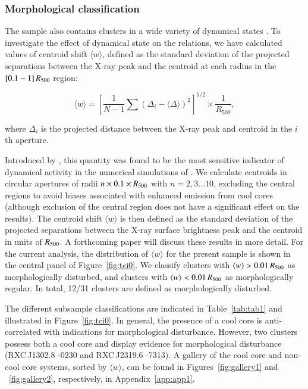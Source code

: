 \documentclass[oldversion]{aa}
\begin{document}
{\subsubsection{Morphological classification}

The sample also contains clusters in a wide variety of dynamical
states \citep{boehringer07,pratt07}. To investigate the effect of
dynamical state on the relations, we have calculated values of centroid shift
$\langle w \rangle$, defined as the standard deviation of the
projected separations between the X-ray peak and the centroid at each
radius in the $[0.1 -1]\, R_{500}$ region:

\begin{equation}
\langle w \rangle = \left[ \frac{1}{N-1} \sum \left(\Delta_i - \langle \Delta \rangle \right)^2 \right]^{1/2} \times \frac{1}{R_{500}}, 
\end{equation}

\noindent where $\Delta_i$ is the projected distance between the X-ray peak and centroid in the $i$\,th aperture.

Introduced by \citet{mfg93}, this quantity was found to be the most sensitive indicator of dynamical activity in the numerical simulations of \citet{poole07}. We calculate centroids in circular apertures of radii $n \times 0.1 \times R_{500}$ with $n=2, 3\ldots10$, excluding the central regions to avoid biases associated with enhanced emission from cool cores (although exclusion of the central region does not have a significant effect on the results). The centroid shift $\langle w \rangle$ is then defined as the standard deviation of the projected separations between the X-ray surface brightness peak and the centroid in units of $R_{500}$. A forthcoming paper will discuss these results in more detail. For the current analysis, the distribution of $\langle w \rangle$ for the present sample is shown in the central panel of Figure~\ref{fig:tci0}. We classify clusters with $\langle w \rangle > 0.01\,R_{500}$ as morphologically disturbed, and
clusters with $\langle w \rangle < 0.01\,R_{500}$ as morphologically
regular. In total, 12/31 clusters are defined as morphologically disturbed. 

The different subsample classifications are indicated in Table~\ref{tab:tab1} and illustrated in Figure~\ref{fig:tci0}. In general, the presence of a cool core is anti-correlated with indications for morphological disturbance. However, two clusters possess both a cool core and display evidence for morphological disturbance (RXC\,J1302.8 -0230 and RXC\,J2319.6 -7313). A gallery of the cool core and non-cool core systems, sorted by $\langle w \rangle$,  can be found in Figures~\ref{fig:gallery1} and ~\ref{fig:gallery2}, respectively, in Appendix~\ref{app:app1}.

}
\end{document}
